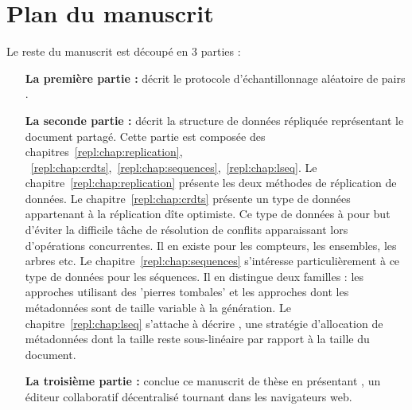 
\section{Plan du manuscrit}

Le reste du manuscrit est découpé en 3 parties :

\begin{itemize}
\item [\textbf{La première partie :}] décrit le protocole d'échantillonnage
  aléatoire de pairs \SPRAY.
\item [\textbf{La seconde partie :}] décrit la structure de données répliquée
  représentant le document partagé. Cette partie est composée des
  chapitres~\ref{repl:chap:replication},
  ~\ref{repl:chap:crdts},~\ref{repl:chap:sequences},~\ref{repl:chap:lseq}. Le
  chapitre~\ref{repl:chap:replication} présente les deux méthodes de réplication
  de données. Le chapitre~\ref{repl:chap:crdts} présente un type de données
  appartenant à la réplication dîte optimiste. Ce type de données à pour but
  d'éviter la difficile tâche de résolution de conflits apparaissant lors
  d'opérations concurrentes. Il en existe pour les compteurs, les ensembles, les
  arbres etc. Le chapitre~\ref{repl:chap:sequences} s'intéresse particulièrement
  à ce type de données pour les séquences. Il en distingue deux familles : les
  approches utilisant des 'pierres tombales' et les approches dont les
  métadonnées sont de taille variable à la génération. Le
  chapitre~\ref{repl:chap:lseq} s'attache à décrire \LSEQ, une stratégie
  d'allocation de métadonnées dont la taille reste sous-linéaire par rapport à
  la taille du document.
\item [\textbf{La troisième partie :}] conclue ce manuscrit de thèse en
  présentant \CRATE, un éditeur collaboratif décentralisé tournant dans les
  navigateurs web. 
\end{itemize}



